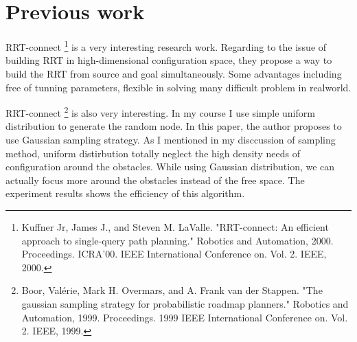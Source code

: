 \documentclass{article}
\begin{document}
\clearpage
\section{Previous work}

RRT-connect \footnote{Kuffner Jr, James J., and Steven M. LaValle. "RRT-connect: An efficient approach to single-query path planning." Robotics and Automation, 2000. Proceedings. ICRA'00. IEEE International Conference on. Vol. 2. IEEE, 2000.} is a very interesting research work. Regarding to the issue of building RRT in high-dimensional configuration space, they propose a way to build the RRT from source and goal simultaneously. Some advantages including free of tunning parameters, flexible in solving many difficult problem in realworld.

RRT-connect \footnote{Boor, Valérie, Mark H. Overmars, and A. Frank van der Stappen. "The gaussian sampling strategy for probabilistic roadmap planners." Robotics and Automation, 1999. Proceedings. 1999 IEEE International Conference on. Vol. 2. IEEE, 1999.} is also very interesting. In my course I use simple uniform distribution to generate the random node. In this paper, the author proposes to use Gaussian sampling strategy. As I mentioned in my disccussion of sampling method, uniform distirbution totally neglect the high density needs of configuration around the obstacles. While using Gaussian distribution, we can actually focus more around the obstacles instead of the free space. The experiment results shows the efficiency of this algorithm.
\end{document}
